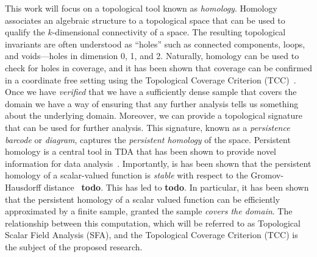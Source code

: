 This work will focus on a topological tool known as \emph{homology}.
Homology associates an algebraic structure to a topological space that can be used to qualify the $k$-dimensional connectivity of a space.
The resulting topological invariants are often understood as ``holes'' such as connected components, loops, and voids---holes in dimension 0, 1, and 2.
Naturally, homology can be used to check for holes in coverage, and it has been shown that coverage can be confirmed in a coordinate free setting using the Topological Coverage Criterion (TCC)~\cite{desilva07coverage}.
Once we have \emph{verified} that we have a sufficiently dense sample that covers the domain we have a way of ensuring that any further analysis tells us something about the underlying domain.
Moreover, we can provide a topological signature that can be used for further analysis.
This signature, known as a \emph{persistence barcode} or \emph{diagram}, captures the \emph{persistent homology} of the space.
Persistent homology is a central tool in TDA that has been shown to provide novel information for data analysis~\cite{todo}.
Importantly, is has been shown that the persistent homology of a scalar-valued function is \emph{stable} with respect to the Gromov-Hausdorff distance~\cite{todo} \textbf{todo}.
This has led to \textbf{todo}.
In particular, it has been shown that the persistent homology of a scalar valued function can be efficiently approximated by a finite sample, granted the sample \emph{covers the domain}.
The relationship between this computation, which will be referred to as Topological Scalar Field Analysis (SFA), and the Topological Coverage Criterion (TCC) is the subject of the proposed research.

